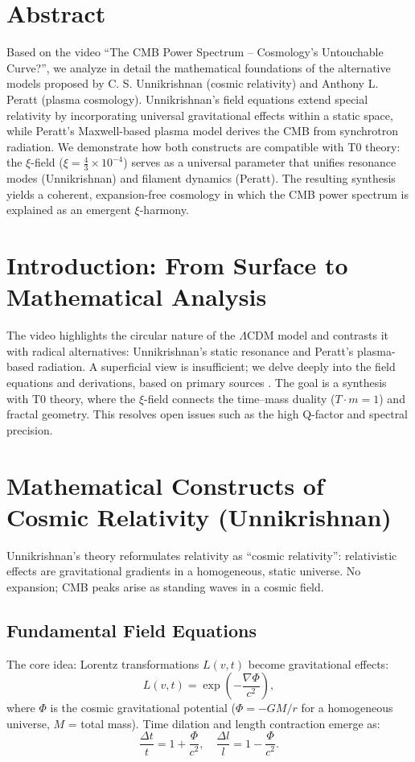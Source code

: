 \section*{Abstract}
		Based on the video ``The CMB Power Spectrum -- Cosmology's Untouchable Curve?'', we analyze in detail the mathematical foundations of the alternative models proposed by C. S. Unnikrishnan (cosmic relativity) and Anthony L. Peratt (plasma cosmology). Unnikrishnan's field equations extend special relativity by incorporating universal gravitational effects within a static space, while Peratt's Maxwell-based plasma model derives the CMB from synchrotron radiation. We demonstrate how both constructs are compatible with T0 theory: the $\xi$-field ($\xi = \frac{4}{3} \times 10^{-4}$) serves as a universal parameter that unifies resonance modes (Unnikrishnan) and filament dynamics (Peratt). The resulting synthesis yields a coherent, expansion-free cosmology in which the CMB power spectrum is explained as an emergent $\xi$-harmony.

	
	
	\section{Introduction: From Surface to Mathematical Analysis}
	The video \cite{video2025} highlights the circular nature of the $\Lambda$CDM model and contrasts it with radical alternatives: Unnikrishnan's static resonance and Peratt's plasma-based radiation. A superficial view is insufficient; we delve deeply into the field equations and derivations, based on primary sources \cite{unnikrishnan2004, peratt1992}. The goal is a synthesis with T0 theory, where the $\xi$-field connects the time–mass duality ($T \cdot m = 1$) and fractal geometry. This resolves open issues such as the high Q-factor and spectral precision.
	
	\section{Mathematical Constructs of Cosmic Relativity (Unnikrishnan)}
	Unnikrishnan's theory \cite{unnikrishnan2004} reformulates relativity as ``cosmic relativity'': relativistic effects are gravitational gradients in a homogeneous, static universe. No expansion; CMB peaks arise as standing waves in a cosmic field.
	
	\subsection{Fundamental Field Equations}
	The core idea: Lorentz transformations $L(v,t)$ become gravitational effects:
	\begin{equation}
		L(v,t) = \exp\left( -\frac{\nabla \Phi}{c^2} \right),
	\end{equation}
	where $\Phi$ is the cosmic gravitational potential ($\Phi = -GM/r$ for a homogeneous universe, $M$ = total mass). Time dilation and length contraction emerge as:
	\begin{equation}
		\frac{\Delta t}{t} = 1 + \frac{\Phi}{c^2}, \quad \frac{\Delta l}{l} = 1 - \frac{\Phi}{c^2}.
	\end{equation}
	
